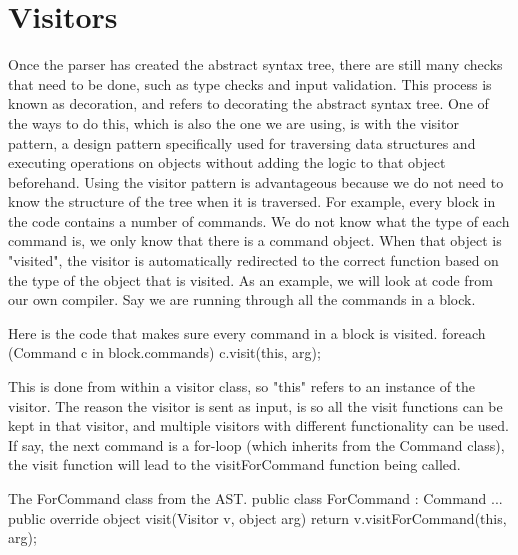 \section{Visitors}
\label{visitors}
Once the parser has created the abstract syntax tree, there are still many checks that need to be done, such as type checks and input validation. 
This process is known as decoration, and refers to decorating the abstract syntax tree. \newline
One of the ways to do this, which is also the one we are using, is with the visitor pattern, a design pattern specifically used for traversing data structures and executing operations on objects without adding the logic to that object beforehand. \newline
Using the visitor pattern is advantageous because we do not need to know the structure of the tree when it is traversed.
For example, every block in the code contains a number of commands. 
We do not know what the type of each command is, we only know that there is a command object. 
When that object is "visited", the visitor is automatically redirected to the correct function based on the type of the object that is visited. \newline
As an example, we will look at code from our own compiler. 
Say we are running through all the commands in a block.
\newline
\begin{source}{Here is the code that makes sure every command in a block is visited.}{}
foreach (Command c in block.commands)
  {
		c.visit(this, arg);
	}
\end{source}

This is done from within a visitor class, so "this" refers to an instance of the visitor. 
The reason the visitor is sent as input, is so all the visit functions can be kept in that visitor, and multiple visitors with different functionality can be used.
If say, the next command is a for-loop (which inherits from the Command class), the visit function will lead to the visitForCommand function being called.

\begin{source}{The ForCommand class from the AST.}{}
public class ForCommand : Command
    {
        ...
        public override object visit(Visitor v, object arg)
        {
            return v.visitForCommand(this, arg);
        }
    }
\end{source}

